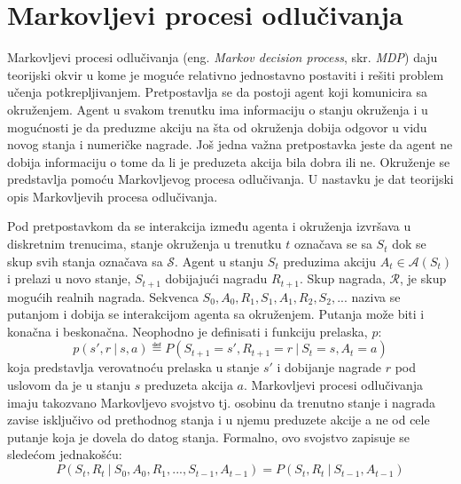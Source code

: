 \chapter{Markovljevi procesi odlučivanja}
\label{ch:mdp}

Markovljevi procesi odlučivanja (eng. {\em Markov decision process}, skr. {\em MDP}) daju teorijski okvir u kome je moguće relativno jednostavno postaviti i rešiti problem učenja potkrepljivanjem. Pretpostavlja se da postoji agent koji komunicira sa okruženjem. Agent u svakom trenutku ima informaciju o stanju okruženja i u mogućnosti je da preduzme akciju na šta od okruženja dobija odgovor u vidu novog stanja i numeričke nagrade. Još jedna važna pretpostavka jeste da agent ne dobija informaciju o tome da li je preduzeta akcija bila dobra ili ne. Okruženje se predstavlja pomoću Markovljevog procesa odlučivanja. U nastavku je dat teorijski opis Markovljevih procesa odlučivanja.
\par 
Pod pretpostavkom da se interakcija između agenta i okruženja izvršava u diskretnim trenucima, stanje okruženja u trenutku $t$ označava se sa $S_t$ dok se skup svih stanja označava sa $\mathcal{S}$.  Agent u stanju $S_t$ preduzima akciju $A_t \in \mathcal{A}(S_t)$ i prelazi u novo stanje, $S_{t+1}$ dobijajući nagradu $R_{t+1}$. Skup nagrada,  $\mathcal{R}$, je skup mogućih realnih nagrada. Sekvenca $S_0, A_0, R_1, S_1, A_1, R_2, S_2, ...$ naziva se putanjom i dobija se interakcijom agenta sa okruženjem. Putanja može biti i konačna i beskonačna.
Neophodno je definisati i funkciju prelaska, $p$:
\begin{equation}
	p(s', r ~|~ s, a) \eqdef P(S_{t+1} = s', R_{t+1} = r ~|~ S_t = s, A_t = a)
\end{equation}
koja predstavlja verovatnoću prelaska u stanje $s'$ i dobijanje nagrade $r$ pod uslovom da je u stanju $s$ preduzeta akcija $a$. Markovljevi procesi odlučivanja imaju takozvano Markovljevo svojstvo tj. osobinu da trenutno stanje i nagrada zavise isključivo od prethodnog stanja i u njemu preduzete akcije a ne od cele putanje koja je dovela do datog stanja. Formalno, ovo svojstvo zapisuje se sledećom jednakošću:
\begin{equation}
	P(S_t, R_t ~|~ S_0, A_0, R_1, ..., S_{t-1}, A_{t-1}) = P(S_t, R_t ~|~ S_{t-1}, A_{t-1})
\end{equation}

